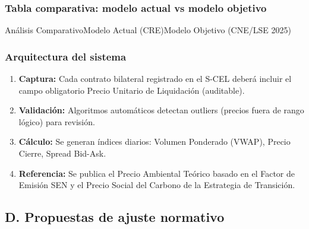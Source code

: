 \documentclass{cel}
\begin{document}
\vspace{0.4cm}
\subsubsection{Tabla comparativa: modelo actual vs modelo objetivo}
\nopagebreak

\vspace{0.3cm}
\begin{tablaParadigmaV2}{Análisis Comparativo}{Modelo Actual (CRE)}{Modelo Objetivo (CNE/LSE 2025)}
\end{tablaParadigmaV2}

\subsubsection{Arquitectura del sistema}
\nopagebreak

\begin{enumerate}
\item \textbf{Captura:} Cada contrato bilateral registrado en el S-CEL deberá incluir el campo obligatorio \textquotedbl{}Precio Unitario de Liquidación\textquotedbl{} (auditable).
\item \textbf{Validación:} Algoritmos automáticos detectan outliers (precios fuera de rango lógico) para revisión.
\item \textbf{Cálculo:} Se generan índices diarios: Volumen Ponderado (VWAP), Precio Cierre, Spread Bid-Ask.
\item \textbf{Referencia:} Se publica el \textquotedbl{}Precio Ambiental Teórico\textquotedbl{} basado en el Factor de Emisión SEN y el Precio Social del Carbono de la Estrategia de Transición.

\end{enumerate}
\subsection{D. Propuestas de ajuste normativo}
\nopagebreak
\end{document}
